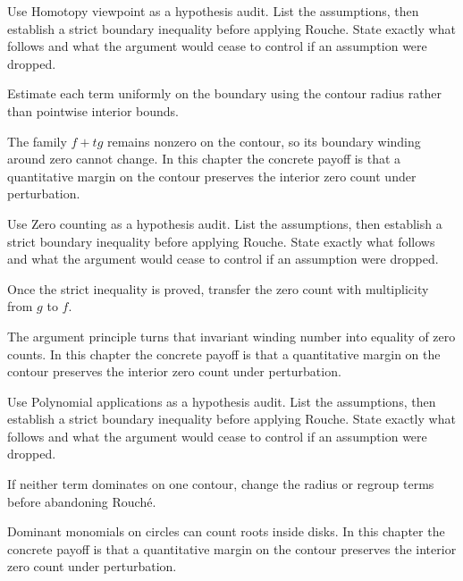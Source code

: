 \begin{exercise}\label{exr:iv13-02}
Use Homotopy viewpoint as a hypothesis audit. List the assumptions, then establish a strict boundary inequality before applying Rouche. State exactly what follows and what the argument would cease to control if an assumption were dropped.
\end{exercise}
\begin{hint}
Estimate each term uniformly on the boundary using the contour radius rather than pointwise interior bounds.
\end{hint}
\begin{solution}
The family $f+t g$ remains nonzero on the contour, so its boundary winding around zero cannot change. In this chapter the concrete payoff is that a quantitative margin on the contour preserves the interior zero count under perturbation.
\end{solution}

\begin{exercise}\label{exr:iv13-03}
Use Zero counting as a hypothesis audit. List the assumptions, then establish a strict boundary inequality before applying Rouche. State exactly what follows and what the argument would cease to control if an assumption were dropped.
\end{exercise}
\begin{hint}
Once the strict inequality is proved, transfer the zero count with multiplicity from \(g\) to \(f\).
\end{hint}
\begin{solution}
The argument principle turns that invariant winding number into equality of zero counts. In this chapter the concrete payoff is that a quantitative margin on the contour preserves the interior zero count under perturbation.
\end{solution}

\begin{exercise}\label{exr:iv13-04}
Use Polynomial applications as a hypothesis audit. List the assumptions, then establish a strict boundary inequality before applying Rouche. State exactly what follows and what the argument would cease to control if an assumption were dropped.
\end{exercise}
\begin{hint}
If neither term dominates on one contour, change the radius or regroup terms before abandoning Rouché.
\end{hint}
\begin{solution}
Dominant monomials on circles can count roots inside disks. In this chapter the concrete payoff is that a quantitative margin on the contour preserves the interior zero count under perturbation.
\end{solution}

